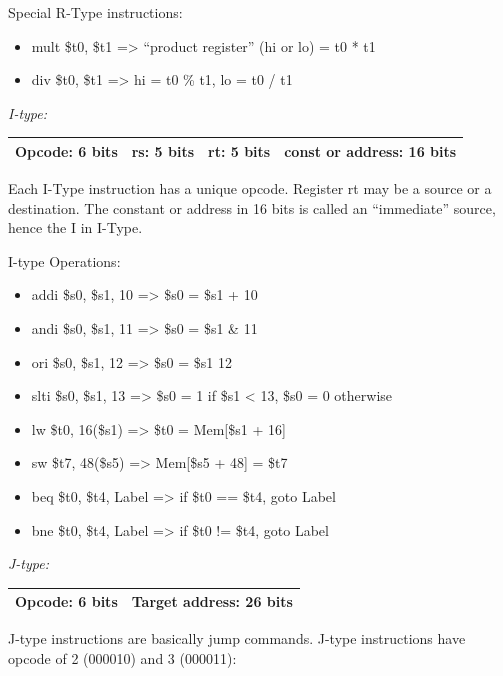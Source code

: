 \documentclass[
    paper=letter,
    parskip=half,
    fontsize=12pt,
    titlepage=firstiscover,
    toc=bibliography,
    numbers=endperiod
]{scrartcl}
\providecommand{\tightlist}{%
  \setlength{\itemsep}{0pt}\setlength{\parskip}{0pt}}
\begin{document}
Special R-Type instructions:

\begin{itemize}
    \tightlist
    \item mult \$t0, \$t1 =\textgreater{} ``product register'' (hi or lo) = t0 * t1
    \item div \$t0, \$t1 =\textgreater{} hi = t0 \% t1, lo = t0 / t1
\end{itemize}

\emph{I-type:}

\begin{tabularx}{\textwidth}{|c|c|c|C|}
    \hline
    Opcode: 6 bits & rs: 5 bits & rt: 5 bits & const or address: 16 bits \\
    \hline
\end{tabularx}

Each I-Type instruction has a unique opcode. Register rt may be a source
or a destination. The constant or address in 16 bits is called an
``immediate'' source, hence the I in I-Type.

I-type Operations:

\begin{itemize}
    \tightlist
    \item addi \$s0, \$s1, 10 =\textgreater{} \$s0 = \$s1 + 10
    \item andi \$s0, \$s1, 11 =\textgreater{} \$s0 = \$s1 \& 11
    \item ori \$s0, \$s1, 12 =\textgreater{} \$s0 = \$s1 \textbar{} 12
    \item slti \$s0, \$s1, 13 =\textgreater{} \$s0 = 1 if \$s1 \textless{} 13, \$s0 = 0 otherwise
    \item lw \$t0, 16(\$s1) =\textgreater{} \$t0 = Mem{[}\$s1 + 16{]}
    \item sw \$t7, 48(\$s5) =\textgreater{} Mem{[}\$s5 + 48{]} = \$t7
    \item beq \$t0, \$t4, Label =\textgreater{} if \$t0 == \$t4, goto Label
    \item bne \$t0, \$t4, Label =\textgreater{} if \$t0 != \$t4, goto Label
\end{itemize}

\emph{J-type:}

\begin{tabularx}{\textwidth}{|c|C|}
    \hline
    Opcode: 6 bits & Target address: 26 bits \\
    \hline
\end{tabularx}

J-type instructions are basically jump commands. J-type instructions
have opcode of 2 (000010) and 3 (000011):
\end{document}
